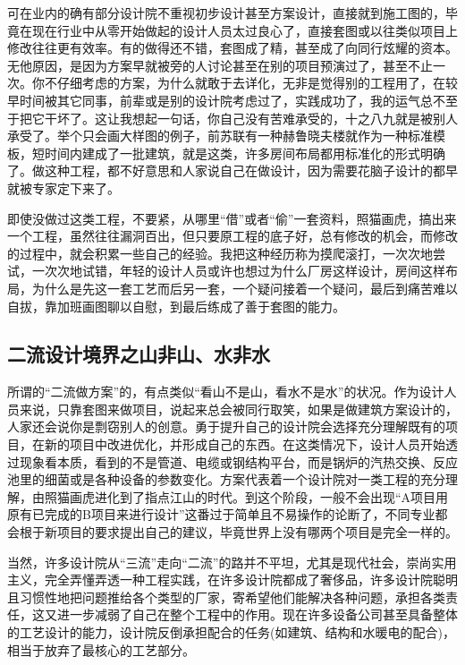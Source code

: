 \documentclass[]{book}
\begin{document}
可在业内的确有部分设计院不重视初步设计甚至方案设计，直接就到施工图的，毕竟在现在行业中从零开始做起的设计人员太过良心了，直接套图或以往类似项目上修改往往更有效率。有的做得还不错，套图成了精，甚至成了向同行炫耀的资本。无他原因，是因为方案早就被旁的人讨论甚至在别的项目预演过了，甚至不止一次。你不仔细考虑的方案，为什么就敢于去详化，无非是觉得别的工程用了，在较早时间被其它同事，前辈或是别的设计院考虑过了，实践成功了，我的运气总不至于把它干坏了。这让我想起一句话，你自己没有苦难承受的，十之八九就是被别人承受了。举个只会画大样图的例子，前苏联有一种赫鲁晓夫楼就作为一种标准模板，短时间内建成了一批建筑，就是这类，许多房间布局都用标准化的形式明确了。做这种工程，都不好意思和人家说自己在做设计，因为需要花脑子设计的都早就被专家定下来了。

即使没做过这类工程，不要紧，从哪里``借''或者``偷''一套资料，照猫画虎，搞出来一个工程，虽然往往漏洞百出，但只要原工程的底子好，总有修改的机会，而修改的过程中，就会积累一些自己的经验。我把这种经历称为摸爬滚打，一次次地尝试，一次次地试错，年轻的设计人员或许也想过为什么厂房这样设计，房间这样布局，为什么是先这一套工艺而后另一套，一个疑问接着一个疑问，最后到痛苦难以自拔，靠加班画图聊以自慰，到最后练成了善于套图的能力。

\hypertarget{ux4e8cux6d41ux8bbeux8ba1ux5883ux754cux4e4bux5c71ux975eux5c71ux6c34ux975eux6c34}{%
\subsection{二流设计境界之山非山、水非水}\label{ux4e8cux6d41ux8bbeux8ba1ux5883ux754cux4e4bux5c71ux975eux5c71ux6c34ux975eux6c34}}

所谓的``二流做方案''的，有点类似``看山不是山，看水不是水''的状况。作为设计人员来说，只靠套图来做项目，说起来总会被同行取笑，如果是做建筑方案设计的，人家还会说你是剽窃别人的创意。勇于提升自己的设计院会选择充分理解既有的项目，在新的项目中改进优化，并形成自己的东西。在这类情况下，设计人员开始透过现象看本质，看到的不是管道、电缆或钢结构平台，而是锅炉的汽热交换、反应池里的细菌或是各种设备的参数变化。方案代表着一个设计院对一类工程的充分理解，由照猫画虎进化到了指点江山的时代。到这个阶段，一般不会出现``A项目用原有已完成的B项目来进行设计''这番过于简单且不易操作的论断了，不同专业都会根于新项目的要求提出自己的建议，毕竟世界上没有哪两个项目是完全一样的。

当然，许多设计院从``三流''走向``二流''的路并不平坦，尤其是现代社会，崇尚实用主义，完全弄懂弄透一种工程实践，在许多设计院都成了奢侈品，许多设计院聪明且习惯性地把问题推给各个类型的厂家，寄希望他们能解决各种问题，承担各类责任，这又进一步减弱了自己在整个工程中的作用。现在许多设备公司甚至具备整体的工艺设计的能力，设计院反倒承担配合的任务(如建筑、结构和水暖电的配合)，相当于放弃了最核心的工艺部分。
\end{document}
